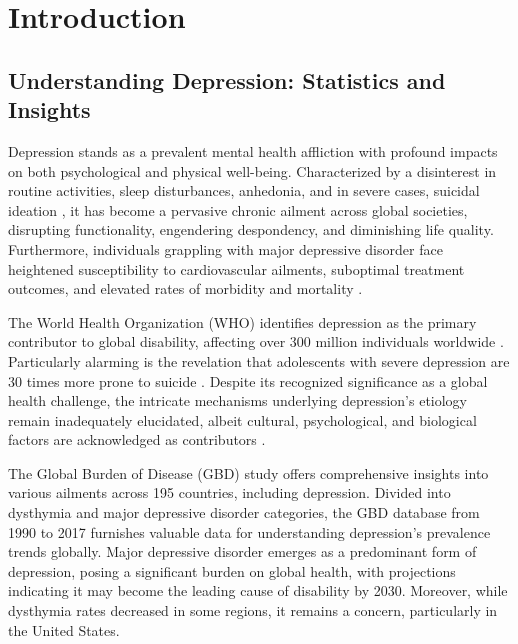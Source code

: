 \chapter{Introduction}

\label{intro}

\section{Understanding Depression: Statistics and Insights}
\label{sec:ch1sec1}

\par \quad Depression stands as a prevalent mental health affliction with profound impacts on both psychological and physical well-being. Characterized by a disinterest in routine activities, sleep disturbances, anhedonia, and in severe cases, suicidal ideation \cite{cui2015systematic}, it has become a pervasive chronic ailment across global societies, disrupting functionality, engendering despondency, and diminishing life quality. Furthermore, individuals grappling with major depressive disorder face heightened susceptibility to cardiovascular ailments, suboptimal treatment outcomes, and elevated rates of morbidity and mortality \cite{seligman2015interface,luo2018effects}.

The World Health Organization (WHO) identifies depression as the primary contributor to global disability, affecting over 300 million individuals worldwide \cite{smith2014world}. Particularly alarming is the revelation that adolescents with severe depression are 30 times more prone to suicide \cite{stringaris2017depression}. Despite its recognized significance as a global health challenge, the intricate mechanisms underlying depression's etiology remain inadequately elucidated, albeit cultural, psychological, and biological factors are acknowledged as contributors \cite{gross2014silver,menard2016pathogenesis}.

The Global Burden of Disease (GBD) study \cite{liu2020changes} offers comprehensive insights into various ailments across 195 countries, including depression. Divided into dysthymia and major depressive disorder categories, the GBD database from 1990 to 2017 furnishes valuable data for understanding depression's prevalence trends globally. Major depressive disorder emerges as a predominant form of depression, posing a significant burden on global health, with projections indicating it may become the leading cause of disability by 2030. Moreover, while dysthymia rates decreased in some regions, it remains a concern, particularly in the United States.

